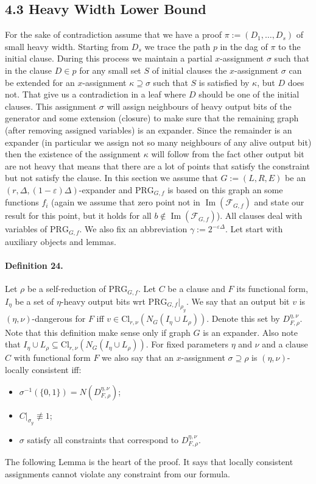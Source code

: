 \documentclass[10pt,a4paper]{article}
\begin{document}
\subsection*{4.3 Heavy Width Lower Bound}
For the sake of contradiction assume that we have a proof $\pi:=(D_1,\ldots,D_s)$ of small heavy width. Starting from $D_s$ we trace the path $p$ in the dag of $\pi$ to the initial clause. During this process we maintain a partial $x$-assignment $\sigma$ such that in the clause $D\in p$ for any small set $S$ of initial clauses the $x$-assignment $\sigma$ can be extended for an $x$-assignment $\kappa\supseteq\sigma$ such that $S$ is satisfied by $\kappa$, but $D$ does not. That give us a contradiction in a leaf where $D$ should be one of the initial clauses.
This assignment $\sigma$ will assign neighbours of heavy output bits of the generator and some extension (closure) to make sure that the remaining graph (after removing assigned variables) is an expander. Since the remainder is an expander (in particular we assign not so many neighbours of any alive output bit) then the existence of the assignment $\kappa$ will follow from the fact other output bit are not heavy that means that there are a lot of points that satisfy the constraint but not satisfy the clause.
In this section we assume that $G:=(L,R,E)$ be an $(r,\Delta,(1-\varepsilon)\Delta)$-expander and $\mathrm{PRG}_{G,f}$ is based on this graph an some functions $f_i$ (again we assume that zero point not in $\operatorname{Im}(\mathcal F_{G,f})$ and state our result for this point, but it holds for all $b\notin\operatorname{Im}(\mathcal F_{G,f})$). All clauses deal with variables of $\mathrm{PRG}_{G,f}$. We also fix an abbreviation $\gamma:=2^{-\varepsilon\Delta}$.
Let start with auxiliary objects and lemmas.
\paragraph{Definition 24.} Let $\rho$ be a self-reduction of $\mathrm{PRG}_{G,f}$. Let $C$ be a clause and $F$ its functional form, $I_\eta$ be a set of $\eta$-heavy output bits wrt $\mathrm{PRG}_{G,f}|_{\rho_y}$. We say that an output bit $v$ is $(\eta,\nu)$-dangerous for $F$ iff $v\in\mathrm{Cl}_{r,\nu}(N_G(I_\eta\cup L_\rho))$. Denote this set by $D_{F,\rho}^{\eta,\nu}$.
Note that this definition make sense only if graph $G$ is an expander. Also note that $I_\eta\cup L_\rho\subseteq\mathrm{Cl}_{r,\nu}(N_G(I_\eta\cup L_\rho))$. For fixed parameters $\eta$ and $\nu$ and a clause $C$ with functional form $F$ we also say that an $x$-assignment $\sigma\supseteq\rho$ is $(\eta,\nu)$-locally consistent iff:
\begin{itemize}
\item $\sigma^{-1}(\{0,1\})=N(D_{F,\rho}^{\eta,\nu})$;
\item $C|_{\sigma_y}\not\equiv1$;
\item $\sigma$ satisfy all constraints that correspond to $D_{F,\rho}^{\eta,\nu}$.
\end{itemize}
The following Lemma is the heart of the proof. It says that locally consistent assignments cannot violate any constraint from our formula.
\end{document}
